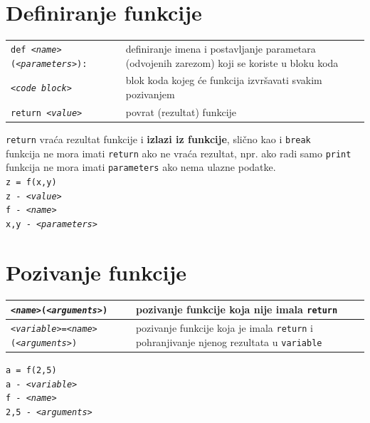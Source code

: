 \documentclass[10pt]{article}
\begin{document}
    \section*{\color{NavyBlue} Definiranje funkcije}
    \begin{tabular}{|>{\tt}p{9.00cm}|>{}p{15.50cm}|}
        \hline
        def \textit{<name>}(\textit{<parameters>}):         & definiranje imena i postavljanje parametara (odvojenih zarezom) koji se koriste u bloku koda \\
        \hspace{5mm}\textit{<code block}>                   & blok koda kojeg će funkcija izvršavati svakim pozivanjem                                     \\ 
        \hspace{5mm}return \textit{<value>}                 & povrat (rezultat) funkcije \\ \hline
    \end{tabular}
    \begin{center}
        \footnotesize
        \texttt{return} vraća rezultat funkcije i \textbf{izlazi iz funkcije}, slično kao i \texttt{break} \\
        funkcija ne mora imati \texttt{return} ako ne vraća rezultat, npr. ako radi samo \texttt{print} \\
        funkcija ne mora imati \texttt{parameters} ako nema ulazne podatke. \\
        \texttt{z = f(x,y)} \\
        \texttt{z - \textit{<value>}} \\
        \texttt{f - \textit{<name>}} \\
        \texttt{x,y - \textit{<parameters>}} \\
    \end{center}

    \section*{\color{NavyBlue} Pozivanje funkcije}
    \begin{tabular}{|>{\tt}p{9.00cm}|>{}p{15.50cm}|}
        \hline
        \textit{<name>}(\textit{<arguments>})                           & pozivanje funkcije koja nije imala \texttt{return}                                                        \\ \hline
        \textit{<variable>}=\textit{<name>}(\textit{<arguments>})       & pozivanje funkcije koja je imala \texttt{return} i pohranjivanje njenog rezultata u \texttt{variable}     \\ \hline
    \end{tabular}
    \begin{center}
        \footnotesize
        \texttt{a = f(2,5)} \\
        \texttt{a - \textit{<variable>}} \\
        \texttt{f - \textit{<name>}} \\
        \texttt{2,5 - \textit{<arguments>}} \\
    \end{center}
\end{document}
